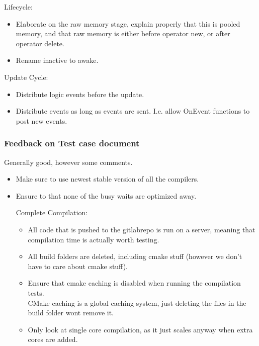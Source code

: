 \documentclass{article}
\begin{document}
\begin{itemize}
    Lifecycle:
    \begin{itemize}
        \item
        Elaborate on the raw memory stage, explain properly that this is pooled memory, and that raw memory is either before operator new, or after operator delete.

        \item
        Rename inactive to awake.
    \end{itemize}

    Update Cycle:
    \begin{itemize}
        \item
        Distribute logic events before the update.

        \item
        Distribute events as long as events are sent. I.e. allow OnEvent functions to post new events.
    \end{itemize}
\end{itemize}

\subsubsection*{Feedback on Test case document}
Generally good, however some comments.
\begin{itemize}
    \item
    Make sure to use newest stable version of all the compilers.

    \item
    Ensure to that none of the busy waits are optimized away.

    Complete Compilation:
    \begin{itemize}
        \item
        All code that is pushed to the gitlabrepo is run on a server, meaning that compilation time is actually worth testing.
        
        \item
        All build folders are deleted, including cmake stuff (however we don't have to care about cmake stuff).

        \item
        Ensure that cmake caching is disabled when running the compilation tests.\\
        CMake caching is a global caching system, just deleting the files in the build folder wont remove it.

        \item
        Only look at single core compilation, as it just scales anyway when extra cores are added.

    \end{itemize}
\end{itemize}
\end{document}
